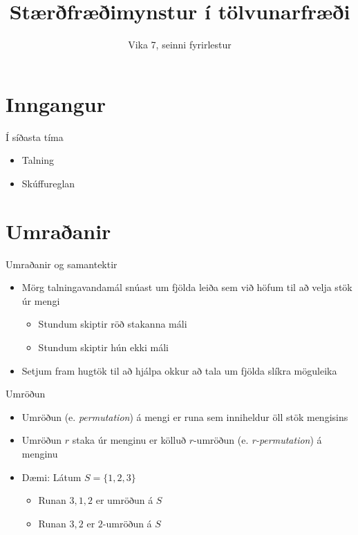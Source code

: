 \documentclass[handout]{beamer}
\title{Stærðfræðimynstur í tölvunarfræði}
\subtitle{Vika 7, seinni fyrirlestur}
\begin{document}
\begin{frame}
\titlepage
\end{frame}


\section{Inngangur}

\begin{frame}{Í síðasta tíma}
\begin{itemize}
 \item Talning
 \item Skúffureglan
\end{itemize}
\end{frame}

\section{Umraðanir}

\begin{frame}{Umraðanir og samantektir}
\begin{itemize}
 \item Mörg talningavandamál snúast um fjölda leiða sem við höfum til að velja stök úr mengi
 \begin{itemize}
  \item Stundum skiptir röð stakanna máli
  \item Stundum skiptir hún ekki máli
 \end{itemize}
 \item Setjum fram hugtök til að hjálpa okkur að tala um fjölda slíkra möguleika
\end{itemize}
\end{frame}

\begin{frame}{Umröðun}
\begin{itemize}
 \item Umröðun (e. \emph{permutation}) á mengi er runa sem inniheldur öll stök mengisins
 \item Umröðun $r$ staka úr menginu er kölluð $r$-umröðun (e. \emph{r-permutation}) á menginu
 \item Dæmi: Látum $S = \{1, 2, 3\}$
 \begin{itemize}
  \item Runan $3, 1, 2$ er umröðun á $S$
  \item Runan $3, 2$ er $2$-umröðun á $S$
 \end{itemize}
\end{itemize}
\end{frame}
\end{document}
